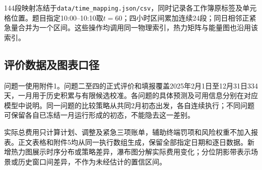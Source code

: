 144段映射冻结于\texttt{data/time\_mapping.json/csv}，同时记录各工作簿原标签及单元格位置。题目指定10:00--10:10取$t=60$；四小时区间累加连续24段；同日相邻正紧急量合并为一个区间。这些操作均调用同一物理索引，热力矩阵与能量图也沿用该索引。

\subsection{评价数据及图表口径}

问题一使用附件1。问题二至四的正式评价和填报覆盖2025年2月1日至12月31日334天，一月用于历史积累与有限候选校准。各问题的具体预测及可用信息分别在对应模型中说明。同一问题的比较策略从共同2月初态出发，各自连续执行；不同问题可保留各自已冻结一月运行形成的初态，不能隐去这一差别。

实际总费用只计算计划、调整及紧急三项账单，辅助终端罚项和风险权重不加入报表。正文表格和附件5均从同一执行数组生成，保留全部指定日期和逐日数据。新增热力图展示时序分布或策略差异，瀑布图分解实际费用变化；分位阴影带表示场景或历史窗口间差异，不作为未经估计的置信区间。
